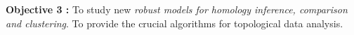 \vspace{2mm}

{\bf Objective 3 :} To study new {\em robust models for homology inference, comparison and  clustering}. To provide the crucial  algorithms for topological data analysis.

